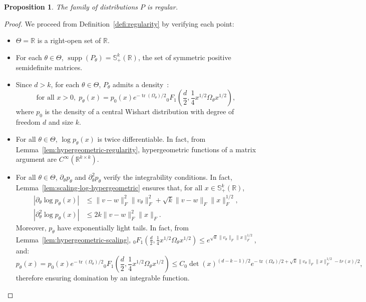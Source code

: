 \documentclass{article}
\theoremstyle{plain}
\newtheorem{proposition}{Proposition}[section]
\theoremstyle{definition}
\theoremstyle{remark}
\DeclareMathOperator{\tr}{tr}
\DeclareMathOperator{\supp}{supp}
\begin{document}
\begin{proposition}
\label{prop:regularity-wishart}
    The family of distributions $P$ is regular.
\end{proposition}

\begin{proof}
    We proceed from Definition~\ref{defi:regularity} by verifying each point:
    \begin{itemize}
        \item $\Theta = \mathbb{R}$ is a right-open set of $\mathbb{R}$.
        \item For each $\theta \in \Theta$, $\supp(P_\theta) = \mathbb{S}_+^k(\mathbb{R})$, the set of symmetric positive semidefinite matrices.
        \item Since $d > k$, for each $\theta \in \Theta$, $P_\theta$ admits a density~\citep{Muirhead2009}: \[\text{for all }x > 0,\; p_\theta(x) = p_0(x) e^{- \tr(\Omega_\theta)/2} {}_0F_1\left(\frac{d}{2}, \frac{1}{4}x^{1/2} \Omega_\theta x^{1/2}\right),\]
        where $p_0$ is the density of a central Wishart distribution with degree of freedom $d$ and size $k$.
        \item For all $\theta \in \Theta$, $\log p_\theta(x)$ is twice differentiable. In fact, from Lemma~\ref{lem:hypergeometric-regularity}, hypergeometric functions of a matrix argument are $C^\infty(\mathbb{R}^{k \times k})$.
        \item For all $\theta \in \Theta$, $\partial_\theta p_\theta$ and $\partial_\theta^2 p_\theta$ verify the integrability conditions. In fact, Lemma~\ref{lem:scaling-log-hypergeometric} ensures that, for all $x \in \mathbb{S}_+^k(\mathbb{R})$,
        \begin{align*}
            \left|\partial_\theta \log p_\theta(x)\right| &\leq \|v-w\|_F^2 \|v_\theta\|_F^2 +\sqrt{k} \|v-w\|_F  \|x\|_F^{1/2},\\
            \left|\partial_\theta^2 \log p_\theta(x)\right| &\leq 2k \|v-w\|_F^2 \|x\|_F.
        \end{align*}
        Moreover, $p_\theta$ have exponentially light tails. In fact, from Lemma~\ref{lem:hypergeometric-scaling}, ${}_0F_1\left(\frac{d}{2}, \frac{1}{4}x^{1/2} \Omega_\theta x^{1/2}\right) \leq e^{\sqrt{k}\|v_\theta\|_F \|x\|_F^{1/2}}$, and:
        \[p_\theta(x) = p_0(x) e^{- \tr(\Omega_\theta)/2} {}_0F_1\left(\frac{d}{2}, \frac{1}{4}x^{1/2} \Omega_\theta x^{1/2}\right) \leq C_0 \det(x)^{(d-k-1)/2} e^{- \tr(\Omega_\theta)/2 + \sqrt{k}\|v_\theta\|_F \|x\|_F^{1/2} - tr(x)/2},\]
        therefore ensuring domination by an integrable function.

\end{itemize}
\end{proof}
\end{document}
